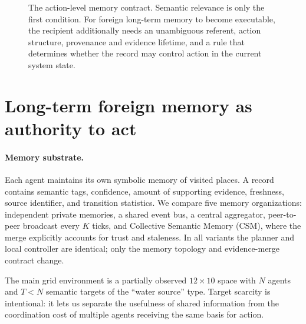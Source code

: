 \documentclass{article}
\begin{document}
\begin{figure}[t]
\centering
{}
\caption{The action-level memory contract. Semantic relevance is only the first condition. For foreign long-term memory to become executable, the recipient additionally needs an unambiguous referent, action structure, provenance and evidence lifetime, and a rule that determines whether the record may control action in the current system state.}
\label{fig:contract}
\end{figure}

\section{Long-term foreign memory as authority to act}

\paragraph{Memory substrate.}
Each agent maintains its own symbolic memory of visited places. A record contains semantic tags, confidence, amount of supporting evidence, freshness, source identifier, and transition statistics. We compare five memory organizations: independent private memories, a shared event bus, a central aggregator, peer-to-peer broadcast every $K$ ticks, and Collective Semantic Memory (CSM), where the merge explicitly accounts for trust and staleness. In all variants the planner and local controller are identical; only the memory topology and evidence-merge contract change.

The main grid environment is a partially observed $12\times 10$ space with $N$ agents and $T<N$ semantic targets of the ``water source'' type. Target scarcity is intentional: it lets us separate the usefulness of shared information from the coordination cost of multiple agents receiving the same basis for action.
\end{document}
